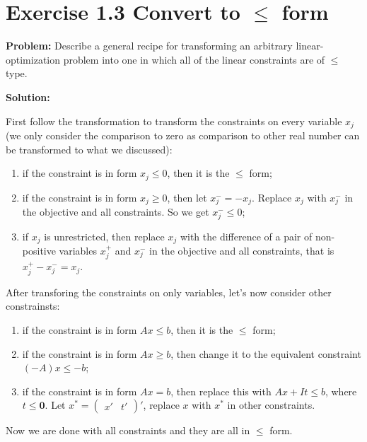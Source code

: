 \section{Exercise 1.3 Convert to $\leq$ form}
\textbf{Problem:} Describe a general recipe for transforming an arbitrary linear-optimization problem into one in which all of the linear constraints are of $\leq$ type.

\textbf{Solution:}

First follow the transformation to transform the constraints on every variable $x_j$ (we only consider the comparison to zero as comparison to other real number can be transformed to what we discussed):

\begin{enumerate}
\item if the constraint is in form $x_j \leq 0 $, then it is the $\leq$ form;
\item if the constraint is in form $x_j \geq 0 $, then let $x_j^- = - x_j$. Replace $x_j$ with $x_j^-$ in the objective and all constraints. So we get $x_j^- \leq 0$;
\item if $x_j$ is unrestricted, then replace $x_j$ with the difference of a pair of non-positive variables $x_j^+$ and $x_j^-$ in the objective and all constraints, that is $x_j^+-x_j^- = x_j$.
\end{enumerate}

After transforing the constraints on only variables, let's now consider other constrainsts:

\begin{enumerate}
\item if the constraint is in form $Ax \leq b$, then it is the $\leq$ form;
\item if the constraint is in form $Ax \geq b$, then change it to the equivalent constraint $(-A)x \leq -b$;
\item if the constraint is in form $Ax = b$, then replace this with $Ax + It \leq b $, where $t \leq \mathbf{0}$. Let $x^* = \left(
\begin{array}{cc}
 x' & t' 
\end{array}
\right)'$, replace $x$ with $x^*$ in other constraints.
\end{enumerate}

Now we are done with all constraints and they are all in $\leq$ form.